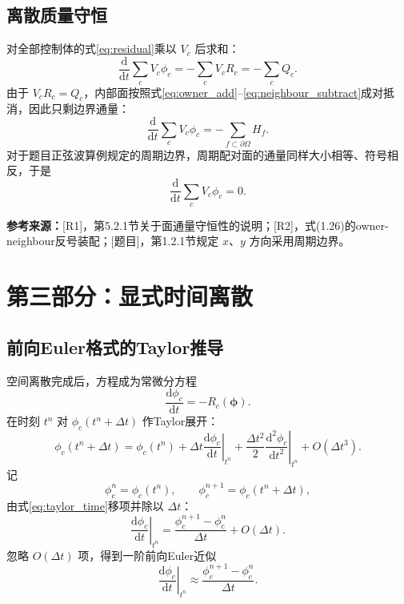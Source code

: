 \documentclass[UTF8,12pt,a4paper]{ctexart}
\numberwithin{equation}{section}
\newcommand{\Rone}{\textnormal{[R1]}}
\newcommand{\Rtwo}{\textnormal{[R2]}}
\newcommand{\Task}{\textnormal{[题目]}}
\newcommand{\source}[1]{%
  \par\smallskip
  \noindent\colorbox{sourcebg}{%
    \parbox{0.955\linewidth}{\footnotesize\color{sourcegray}\textbf{参考来源：}#1}%
  }
  \par\smallskip
}
\newcommand{\phiv}{\bm\phi}
\begin{document}
\subsection{离散质量守恒}

对全部控制体的式\eqref{eq:residual}乘以 $V_c$ 后求和：
\begin{equation}
  \frac{\mathrm d}{\mathrm dt}\sum_cV_c\phi_c
  =-\sum_cV_cR_c
  =-\sum_cQ_c.
  \label{eq:global_mass1}
\end{equation}
由于 $V_cR_c=Q_c$，内部面按照式\eqref{eq:owner_add}--\eqref{eq:neighbour_subtract}成对抵消，因此只剩边界通量：
\begin{equation}
  \frac{\mathrm d}{\mathrm dt}\sum_cV_c\phi_c
  =-\sum_{f\subset\partial\Omega}H_f.
  \label{eq:global_mass2}
\end{equation}
对于题目正弦波算例规定的周期边界，周期配对面的通量同样大小相等、符号相反，于是
\begin{equation}
  \boxed{
  \frac{\mathrm d}{\mathrm dt}\sum_cV_c\phi_c=0
  }.
  \label{eq:mass_conservation}
\end{equation}

\source{\Rone，第5.2.1节关于面通量守恒性的说明；\Rtwo，式(1.26)的owner-neighbour反号装配；\Task，第1.2.1节规定 $x$、$y$ 方向采用周期边界。}

\newpage
\section{第三部分：显式时间离散}

\subsection{前向Euler格式的Taylor推导}

空间离散完成后，方程成为常微分方程
\begin{equation}
  \frac{\mathrm d\phi_c}{\mathrm dt}
  =-R_c(\phiv).
  \label{eq:ode_before_time}
\end{equation}
在时刻 $t^n$ 对 $\phi_c(t^n+\Delta t)$ 作Taylor展开：
\begin{equation}
  \phi_c(t^n+\Delta t)
  =\phi_c(t^n)
  +\Delta t\left.\frac{\mathrm d\phi_c}{\mathrm dt}\right|_{t^n}
  +\frac{\Delta t^2}{2}
  \left.\frac{\mathrm d^2\phi_c}{\mathrm dt^2}\right|_{t^n}
  +O(\Delta t^3).
  \label{eq:taylor_time}
\end{equation}
记
\begin{equation}
  \phi_c^n=\phi_c(t^n),
  \qquad
  \phi_c^{n+1}=\phi_c(t^n+\Delta t),
  \label{eq:time_notation}
\end{equation}
由式\eqref{eq:taylor_time}移项并除以 $\Delta t$：
\begin{equation}
  \left.\frac{\mathrm d\phi_c}{\mathrm dt}\right|_{t^n}
  =\frac{\phi_c^{n+1}-\phi_c^n}{\Delta t}+O(\Delta t).
  \label{eq:forward_difference}
\end{equation}
忽略 $O(\Delta t)$ 项，得到一阶前向Euler近似
\begin{equation}
  \left.\frac{\mathrm d\phi_c}{\mathrm dt}\right|_{t^n}
  \approx\frac{\phi_c^{n+1}-\phi_c^n}{\Delta t}.
  \label{eq:forward_euler_derivative}
\end{equation}
\end{document}
